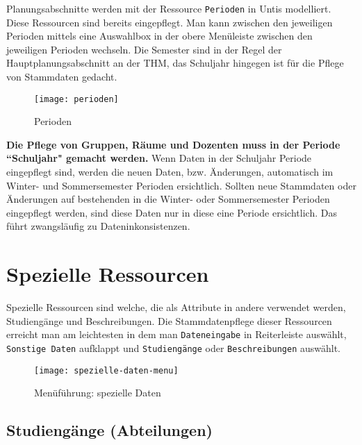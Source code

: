 Planungsabschnitte werden mit der Ressource \texttt{Perioden} in Untis modelliert. Diese Ressourcen sind bereits eingepflegt. Man kann zwischen den jeweiligen Perioden mittels eine Auswahlbox in der obere Menüleiste zwischen den jeweiligen Perioden wechseln. Die Semester sind in der Regel der Hauptplanungsabschnitt an der THM, das Schuljahr hingegen ist für die Pflege von Stammdaten gedacht.\\

\newpage

\begin{wrapfigure}{r}{0.25\textwidth}
	\vspace{-4pt}
	\texttt{[image: perioden]}
	\vspace{-15pt}
	\caption{Perioden}
	\label{fig:mf-sg}
\end{wrapfigure}

\noindent
\textbf{Die Pflege von Gruppen, Räume und Dozenten muss in der Periode ``Schuljahr" gemacht werden.} Wenn Daten in der Schuljahr Periode eingepflegt sind, werden die neuen Daten, bzw. Änderungen, automatisch im Winter- und Sommersemester Perioden ersichtlich. Sollten neue Stammdaten oder Änderungen auf bestehenden in die Winter- oder Sommersemester Perioden eingepflegt werden, sind diese Daten nur in diese eine Periode ersichtlich. Das führt zwangsläufig zu Dateninkonsistenzen.\\

\section{Spezielle Ressourcen}

Spezielle Ressourcen sind welche, die als Attribute in andere verwendet werden, Studiengänge und Beschreibungen. Die Stammdatenpflege dieser Ressourcen erreicht man am leichtesten in dem man \texttt{Dateneingabe} in Reiterleiste auswählt, \texttt{Sonstige Daten} aufklappt und \texttt{Studiengänge} oder \texttt{Beschreibungen} auswählt.\\

\begin{figure}[h]
	\centering
	\texttt{[image: spezielle-daten-menu]}
	\vspace{-5pt}
	\caption{Menüführung: spezielle Daten}
	\label{fig:spezielle-daten-menu}
\end{figure}

\subsection{Studiengänge (Abteilungen)}

